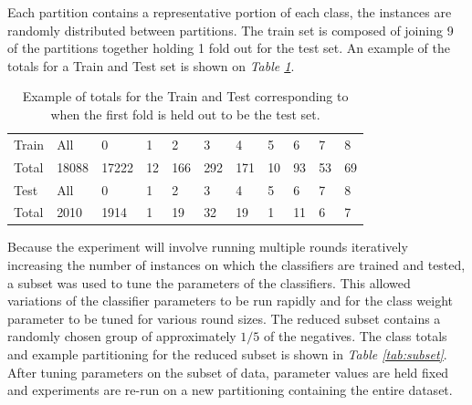 \documentclass[ms]{nuthesis}
\begin{document}
\par Each partition contains a representative portion of each class, the instances are randomly
distributed between partitions. The train set is composed of joining 9 of the partitions together
holding 1 fold out for the test set. An example of the totals for a Train and Test set
is shown on \textit{Table \ref{tab:TrainTest}}.

\FloatBarrier
\begin{table}[H]
  \centering
  \caption{Example of totals for the Train and Test corresponding to when the first fold is
  held out to be the test set.}
  \label{tab:TrainTest}
  \begin{tabular}{|l||l||l||l||l||l||l||l||l||l||l|}\toprule
    Train & All & 0 & 1 & 2 & 3 & 4 & 5 & 6 & 7 & 8 \\
    Total & 18088 & 17222 & 12 & 166 & 292 & 171 & 10 & 93 & 53 & 69 \\ \midrule
    Test & All &  0 & 1 & 2 & 3 & 4 & 5 & 6 & 7 & 8 \\
    Total & 2010 & 1914 & 1 & 19 & 32 & 19 & 1 & 11 & 6 & 7 \\
 \bottomrule
  \end{tabular}
\end{table}
\FloatBarrier

\par Because the experiment will involve running multiple rounds iteratively increasing the
number of instances on which the classifiers are trained and tested, a subset was used to
tune the parameters of the classifiers. This allowed variations of the classifier parameters to be
run rapidly and for the class weight parameter to be tuned for various round sizes. The reduced subset
contains a randomly chosen group of approximately $1/5$ of the negatives. The class totals and example
partitioning for the reduced subset is shown in \textit{Table \ref{tab:subset}}. After tuning parameters
on the subset of data, parameter values are held fixed and experiments are re-run on a new partitioning
containing the entire dataset.
\end{document}
